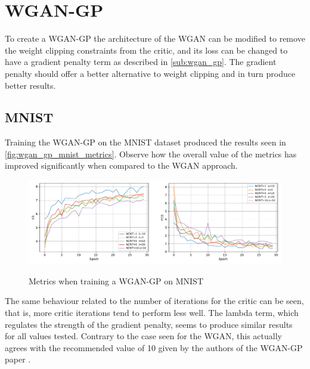 \section{WGAN-GP}
To create a \gls{WGAN-GP} the architecture of the \gls{WGAN} can be modified to remove the weight clipping constraints from the critic, and its loss can be changed to have a gradient penalty term as described in \autoref{sub:wgan_gp}. The gradient penalty should offer a better alternative to weight clipping and in turn produce better results.

\subsection{MNIST}
Training the \gls{WGAN-GP} on the \gls{MNIST} dataset produced the results seen in \autoref{fig:wgan_gp_mnist_metrics}. Observe how the overall value of the metrics has improved significantly when compared to the \gls{WGAN} approach.
\begin{figure}[hbt]
    \centering
    \caption{Metrics when training a WGAN-GP on MNIST}
    \includegraphics[width=\textwidth]{chapters/Experiments/WGAN-GP/mnist_metrics.pdf}
    \label{fig:wgan_gp_mnist_metrics}
\end{figure}

The same behaviour related to the number of iterations for the critic can be seen, that is, more critic iterations tend to perform less well. The \gls{lambda} term, which regulates the strength of the gradient penalty, seems to produce similar results for all values tested. Contrary to the case seen for the \gls{WGAN}, this actually agrees with the recommended value of 10 given by the authors of the \gls{WGAN-GP} paper \cite{wgan-gp2017}.

